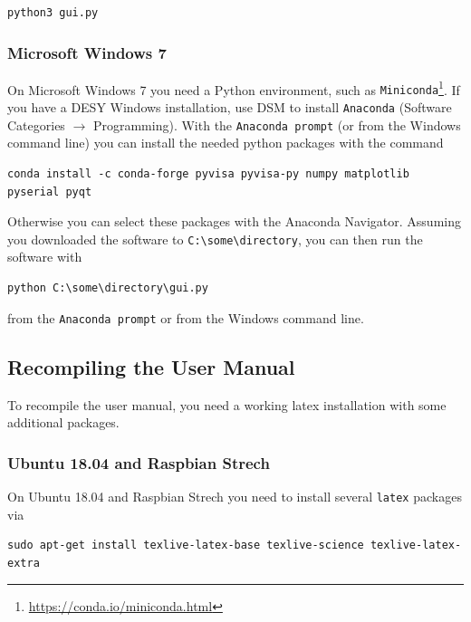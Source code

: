 \documentclass[a4paper]{article}
\begin{document}
\medskip
\begin{lstlisting}
python3 gui.py
\end{lstlisting}
\medskip

\subsubsection{Microsoft Windows 7}

On Microsoft Windows 7 you need a Python environment, such as {\tt Miniconda}\footnote{\href{https://conda.io/miniconda.html}{https://conda.io/miniconda.html}}.
If you have a DESY Windows installation, use DSM to install {\tt Anaconda} (Software Categories $\rightarrow$ Programming).
With the {\tt Anaconda prompt} (or from the Windows command line) you can install the needed python packages with the command

\medskip
\begin{lstlisting}
conda install -c conda-forge pyvisa pyvisa-py numpy matplotlib pyserial pyqt
\end{lstlisting}
\medskip

Otherwise you can select these packages with the Anaconda Navigator.
Assuming you downloaded the software to {\tt C:\textbackslash some\textbackslash directory}, you can then run the software with

\medskip
\begin{lstlisting}
python C:\some\directory\gui.py
\end{lstlisting}
\medskip

from the {\tt Anaconda prompt} or from the Windows command line.

\subsection{Recompiling the User Manual}

To recompile the user manual, you need a working latex installation with some additional packages.

\subsubsection{Ubuntu 18.04 and Raspbian Strech}

On Ubuntu 18.04 and Raspbian Strech you need to install several {\tt latex} packages via

\medskip
\begin{lstlisting}
sudo apt-get install texlive-latex-base texlive-science texlive-latex-extra
\end{lstlisting}
\medskip
\end{document}
